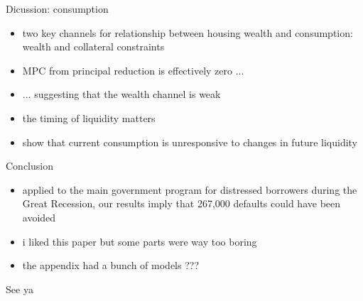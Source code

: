 \begin{frame}{Dicussion: consumption}
    \begin{itemize}
        \item two key channels for relationship between housing wealth and consumption: wealth and collateral constraints
        \item MPC from principal reduction is effectively zero ...
        \item ... suggesting that the wealth channel is weak
        \item the timing of liquidity matters
        \item show that current consumption is unresponsive to changes in future liquidity
    \end{itemize}
\end{frame}

\begin{frame}{Conclusion}
	\begin{itemize}
        \item applied to the main government program for distressed borrowers during the Great Recession, our results imply that 267,000 defaults could have been avoided
		\item i liked this paper but some parts were way too boring
        \item the appendix had a bunch of models ???
	\end{itemize}
\end{frame}

\begin{frame}[plain]
\begin{center}{\LARGE See ya}\end{center}
\end{frame}



